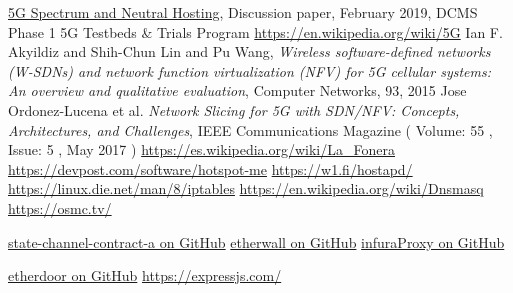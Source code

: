 \documentclass[12pt]{amsart}
\begin{document}
\begin{multicols}{2}
\begin{thebibliography}{9}
  \href{https://uk5g.org/media/uploads/resource_files/Spectrum\_NH\_discussion\_paper\_20Feb19.pdf}{5G Spectrum and Neutral Hosting}, Discussion paper, February 2019,
  DCMS Phase 1 5G Testbeds \& Trials Program
 \href{https://en.wikipedia.org/wiki/5G}{https://en.wikipedia.org/wiki/5G}
 Ian F. Akyildiz and Shih-Chun Lin and Pu Wang,
  \textit{Wireless software-defined networks (W-SDNs) and network function virtualization (NFV) for 5G cellular systems:
    An overview and qualitative evaluation}, Computer Networks, 93, 2015
 Jose Ordonez-Lucena et al.
  \textit{Network Slicing for 5G with SDN/NFV: Concepts, Architectures, and Challenges},
   IEEE Communications Magazine ( Volume: 55 , Issue: 5 , May 2017 )
 \href{https://es.wikipedia.org/wiki/La_Fonera}{https://es.wikipedia.org/wiki/La\_Fonera}
 \href{https://devpost.com/software/hotspot-me}{https://devpost.com/software/hotspot-me}
 \href{https://w1.fi/hostapd/}{https://w1.fi/hostapd/}
 \href{https://linux.die.net/man/8/iptables}{https://linux.die.net/man/8/iptables}
 \href{https://en.wikipedia.org/wiki/Dnsmasq}{https://en.wikipedia.org/wiki/Dnsmasq}
 \href{https://osmc.tv/}{https://osmc.tv/}

  \href{https://github.com/ethereum-internet-access/state-channel-contract-a}{state-channel-contract-a on GitHub}
  \href{https://github.com/ethereum-internet-access/etherwall}{etherwall on GitHub}
  \href{https://github.com/ethereum-internet-access/etherwall/blob/master/infuraProxy.js}{infuraProxy on GitHub}

  \href{https://github.com/ethereum-internet-access/etherdoor}{etherdoor on GitHub}
  \href{https://expressjs.com/}{https://expressjs.com/}


\end{thebibliography}
\end{multicols}
\end{document}
